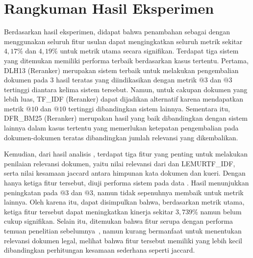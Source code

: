 \section{Rangkuman Hasil Eksperimen}
\label{subbab:5:Rangkuman Hasil Eksperimen}

Berdasarkan hasil eksperimen, didapat bahwa penambahan \lambdamart{} sebagai \reranker{} dengan menggunakan seluruh fitur usulan dapat mengingkatkan seluruh metrik sekitar $4,17\%$ dan $4,19\%$ untuk metrik utama secara signifikan. Terdapat tiga sistem yang ditemukan memiliki performa terbaik berdasarkan kasus tertentu. Pertama, DLH13 (Reranker) merupakan sistem terbaik untuk melakukan pengembalian dokumen pada 3 hasil teratas yang diindikasikan dengan metrik \recall{}$@3$ dan \precision{}$@3$ tertinggi diantara kelima sistem tersebut. Namun, untuk cakupan dokumen yang lebih luas, TF\_IDF (Reranker) dapat dijadikan alternatif karena mendapatkan metrik \recall{}$@10$ dan \precision{}$@10$ tertinggi dibandingkan sistem lainnya. Sementara itu, DFR\_BM25 (Reranker) merupakan hasil yang baik dibandingkan dengan sistem lainnya dalam kasus tertentu yang memerlukan ketepatan pengembalian pada dokumen-dokumen teratas dibandingkan jumlah relevansi yang dikembalikan.

Kemudian, dari hasil analisis \feature{} \importance{}, terdapat tiga fitur yang penting untuk melakukan penilaian relevansi dokumen, yaitu nilai relevansi dari \obm{} dan LEMURTF\_IDF, serta nilai kesamaan jaccard antara himpunan kata dokumen dan kueri. Dengan hanya ketiga fitur tersebut, diuji performa sistem pada data \testing{}. Hasil menunjukkan peningkatan pada \recall{}$@3$ dan \precision{}$@3$, namun tidak sepenuhnya membaik untuk metrik lainnya. Oleh karena itu, dapat disimpulkan bahwa, berdasarkan metrik utama, ketiga fitur tersebut dapat meningkatkan kinerja sekitar $3,739\%$ namun belum cukup signifikan. Selain itu, ditemukan bahwa \importance{} fitur \encoder{} serupa dengan performa temuan penelitian sebelumnya~\citep{devlin2018bert, ni2021sentence}, namun kurang bermanfaat untuk menentukan relevansi dokumen legal, melihat bahwa fitur tersebut memiliki \importance{} yang lebih kecil dibandingkan perhitungan kesamaan sederhana seperti jaccard.

